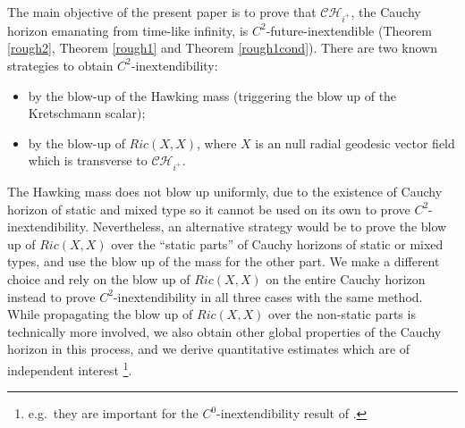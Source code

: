 \documentclass[10pt,a4paper]{article}
\theoremstyle{plain}
\theoremstyle{remark}
\theoremstyle{definition}
\theoremstyle{plain}
\theoremstyle{remark}
\theoremstyle{definition}
\newcommand{\CH}{\mathcal{CH}_{i^+}}
\numberwithin{equation}{section}
\begin{document}
The main objective of the present paper is to prove that $\CH$, the Cauchy horizon emanating from time-like infinity, is $C^2$-future-inextendible (Theorem \ref{rough2}, Theorem \ref{rough1} and Theorem \ref{rough1cond}). There are two known strategies to obtain $C^2$-inextendibility:\begin{itemize}
	\item by the blow-up of the Hawking mass (triggering the blow up of the Kretschmann scalar);
	\item by the blow-up of $Ric(X,X)$, where $X$ is an null radial geodesic vector field which is transverse to $\CH$.
\end{itemize} The Hawking mass does not blow up uniformly, due to the existence of Cauchy horizon of static and mixed type so it cannot be used on its own to prove $C^2$-inextendibility. Nevertheless, an alternative strategy would be to prove the blow up of $Ric(X,X)$ over the ``static parts''  of Cauchy horizons of static or mixed types, and use the blow up of the mass for the other part. We make a different choice and rely on the blow up of $Ric(X,X)$ on the entire Cauchy horizon instead to prove $C^2$-inextendibility in all three cases with the same method. While propagating the blow up of $Ric(X,X)$ over the non-static parts is technically more involved, we also obtain other global properties of the Cauchy horizon in this process, and we derive quantitative estimates which are of independent interest \footnote{e.g.\ they are important for the $C^0$-inextendibility result of \cite{Moi3Christoph}.}.


\end{document}

